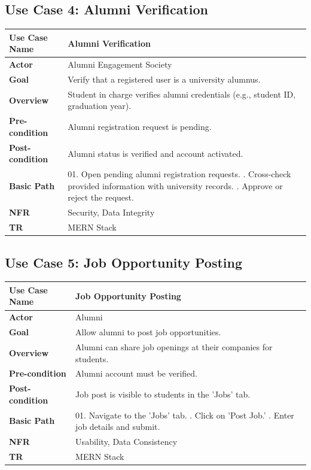 \documentclass[a4paper,12pt]{article}
\begin{document}
\subsection{Use Case 4: Alumni Verification}
\begin{longtable}{|l|p{12cm}|}
\hline
\textbf{Use Case Name} & Alumni Verification \\ \hline
\textbf{Actor} & Alumni Engagement Society \\ \hline
\textbf{Goal} & Verify that a registered user is a university alumnus. \\ \hline
\textbf{Overview} & Student in charge verifies alumni credentials (e.g., student ID, graduation year). \\ \hline
\textbf{Pre-condition} & Alumni registration request is pending. \\ \hline
\textbf{Post-condition} & Alumni status is verified and account activated. \\ \hline
\textbf{Basic Path} & 
01. Open pending alumni registration requests. \newline
02. Cross-check provided information with university records. \newline
03. Approve or reject the request. \\ \hline
\textbf{NFR} & Security, Data Integrity \\ \hline
\textbf{TR} & MERN Stack \\ \hline
\end{longtable}

\subsection{Use Case 5: Job Opportunity Posting}
\begin{longtable}{|l|p{12cm}|}
\hline
\textbf{Use Case Name} & Job Opportunity Posting \\ \hline
\textbf{Actor} & Alumni \\ \hline
\textbf{Goal} & Allow alumni to post job opportunities. \\ \hline
\textbf{Overview} & Alumni can share job openings at their companies for students. \\ \hline
\textbf{Pre-condition} & Alumni account must be verified. \\ \hline
\textbf{Post-condition} & Job post is visible to students in the 'Jobs' tab. \\ \hline
\textbf{Basic Path} & 
01. Navigate to the 'Jobs' tab. \newline
02. Click on 'Post Job.' \newline
03. Enter job details and submit. \\ \hline
\textbf{NFR} & Usability, Data Consistency \\ \hline
\textbf{TR} & MERN Stack \\ \hline
\end{longtable}
\end{document}
